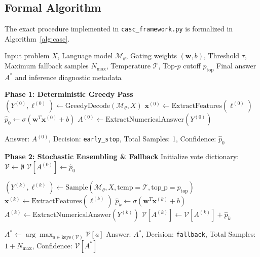 \documentclass[11pt,a4paper]{article}
\begin{document}
\subsection{Formal Algorithm}
The exact procedure implemented in \texttt{casc\_framework.py} is formalized in Algorithm~\ref{alg:casc}.

\begin{algorithm}[H]
\caption{Confidence-Aware Self-Consistency (CaSC) Inference}
\label{alg:casc}
\begin{algorithmic}[1]
\Require Input problem $X$, Language model $\mathcal{M}_\theta$, Gating weights $(\mathbf{w}, b)$, Threshold $\tau$, Maximum fallback samples $N_{\text{max}}$, Temperature $\mathcal{T}$, Top-$p$ cutoff $p_{\text{top}}$
\Ensure Final answer $A^*$ and inference diagnostic metadata

\State \textbf{Phase 1: Deterministic Greedy Pass}
\State $(Y^{(0)}, \boldsymbol{\ell}^{(0)}) \gets \text{GreedyDecode}(\mathcal{M}_\theta, X)$
\State $\mathbf{x}^{(0)} \gets \text{ExtractFeatures}(\boldsymbol{\ell}^{(0)})$ 
\State $\hat{p}_0 \gets \sigma(\mathbf{w}^T \mathbf{x}^{(0)} + b)$
\State $A^{(0)} \gets \text{ExtractNumericalAnswer}(Y^{(0)})$

    \State \Return Answer: $A^{(0)}$, Decision: \texttt{early\_stop}, Total Samples: 1, Confidence: $\hat{p}_0$
\EndIf

\State \textbf{Phase 2: Stochastic Ensembling \& Fallback}
\State Initialize vote dictionary: $\mathcal{V} \gets \emptyset$
    \State $\mathcal{V}[A^{(0)}] \gets \hat{p}_0$
\EndIf

    \State $(Y^{(k)}, \boldsymbol{\ell}^{(k)}) \gets \text{Sample}(\mathcal{M}_\theta, X, \text{temp}=\mathcal{T}, \text{top\_p}=p_{\text{top}})$
    \State $\mathbf{x}^{(k)} \gets \text{ExtractFeatures}(\boldsymbol{\ell}^{(k)})$
    \State $\hat{p}_k \gets \sigma(\mathbf{w}^T \mathbf{x}^{(k)} + b)$
    \State $A^{(k)} \gets \text{ExtractNumericalAnswer}(Y^{(k)})$
        \State $\mathcal{V}[A^{(k)}] \gets \mathcal{V}[A^{(k)}] + \hat{p}_k$ 
    \EndIf
\EndFor

\State $A^* \gets \arg\max_{a \in \text{keys}(\mathcal{V})} \mathcal{V}[a]$
\State \Return Answer: $A^*$, Decision: \texttt{fallback}, Total Samples: $1 + N_{\text{max}}$, Confidence: $\mathcal{V}[A^*]$
\end{algorithmic}
\end{algorithm}
\end{document}
